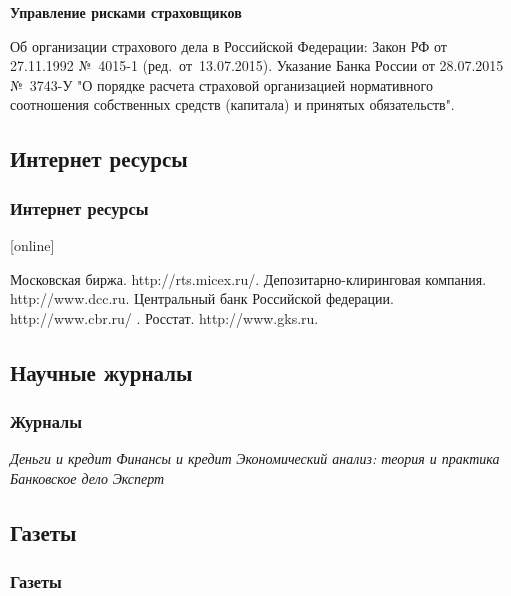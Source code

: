 \documentclass[financial_risks_lectures.tex]{subfiles}
\begin{document}
\begin{frame}[allowframebreaks]
\begin{thebibliography}{10}
\pagebreak

	\textbf{Управление рисками страховщиков}
	
	Об организации страхового дела в Российской Федерации: Закон РФ от 27.11.1992 №~4015-1 (ред.~от~13.07.2015).
	Указание Банка России от 28.07.2015 №~3743-У "О порядке расчета страховой организацией нормативного соотношения собственных средств (капитала) и принятых обязательств".
  \end{thebibliography}
\end{frame}

\subsection*{Интернет ресурсы}
\begin{frame}[allowframebreaks]
  \frametitle<presentation>{Интернет ресурсы}
    
  \begin{thebibliography}{10}
  
  [online]

    Московская биржа.
    \newblock http://rts.micex.ru/.
    Депозитарно-клиринговая компания.
    \newblock http://www.dcc.ru.
    Центральный банк Российской федерации.
    \newblock http://www.cbr.ru/ .
    Росстат.
    \newblock http://www.gks.ru.
  \end{thebibliography}
\end{frame}

\subsection*{Научные журналы}

\begin{frame}
  \frametitle<presentation>{Журналы}
    
  \begin{thebibliography}{10}
  
  \beamertemplatearticlebibitems
  \bibitem{}
  {\em Деньги и кредит}
  \bibitem{}
  	{\em Финансы и кредит}
  \bibitem{}
  	{\em Экономический анализ: теория и практика}
  \bibitem{}
  	{\em Банковское дело}
  \bibitem{}
  	{\em Эксперт}
  
  \end{thebibliography}
\end{frame}

\subsection*{Газеты}

\begin{frame}
  \frametitle<presentation>{Газеты}
    
  \begin{thebibliography}{10}
  
  \beamertemplatearticlebibitems
  \bibitem{}
  \bibitem{}
 
  \end{thebibliography}
\end{frame}
\end{document}
